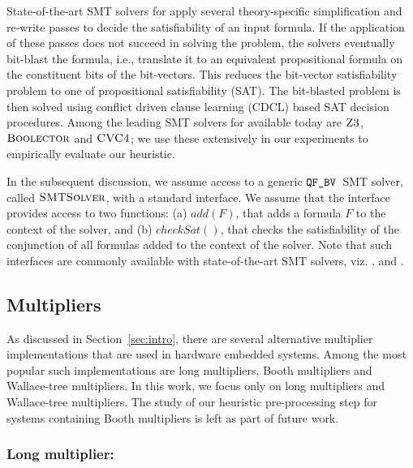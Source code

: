 
%
State-of-the-art SMT solvers for {\qfbv} apply several theory-specific
simplification and re-write passes to decide the satisfiability of an
input {\qfbv} formula.  If the application of these passes does not
succeed in solving the problem, the solvers eventually bit-blast the
formula, i.e., translate it to an equivalent propositional formula on
the constituent bits of the bit-vectors.  This reduces the bit-vector
satisfiability problem to one of propositional satisfiability (SAT).
%
The bit-blasted problem is then solved using conflict driven clause
learning (CDCL)\cite{cdcl1,cdcl2} based SAT decision procedures.
%
Among the leading SMT solvers for {\qfbv} available today are
$\textsc{Z3}$\cite{zthree}, $\textsc{Boolector}$\cite{boolector} and
$\textsc{CVC4}$\cite{cvcfour}; we use these extensively in our experiments
to empirically evaluate our heuristic.

In the subsequent discussion, we assume access to a generic
$\texttt{QF\_BV}$~SMT solver, called $\textsc{SMTSolver}$, with a standard
interface.
%
We assume that the interface provides access to two functions: (a)
$add(F)$, that adds a formula $F$ to the context of the solver, and
(b) $checkSat()$, that checks the satisfiability of the conjunction of
all formulas added to the context of the solver.
%
Note that such interfaces are commonly available with state-of-the-art
SMT solvers, viz. {\boolector}, {\cvcfour} and {\zthree}.

\subsection{Multipliers}

As discussed in Section~\ref{sec:intro}, there are several alternative
multiplier implementations that are used in hardware embedded
systems.
%
Among the most popular such implementations are long
multipliers, Booth multipliers and Wallace-tree multipliers.
%
In this work, we focus only on long multipliers and Wallace-tree
multipliers.
%
The study of our heuristic pre-processing step for systems containing
Booth multipliers is left as part of future work.
 
\vspace{-3ex}
\subsubsection{Long multiplier:}\label{sec:long-mult}


